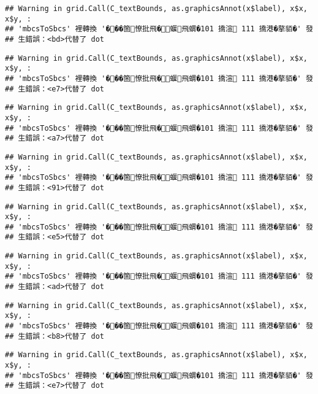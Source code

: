 \documentclass[
]{article}
\begin{document}
\begin{verbatim}
## Warning in grid.Call(C_textBounds, as.graphicsAnnot(x$label), x$x, x$y, :
## 'mbcsToSbcs' 裡轉換 '���箇憭批飛�蝘飛蝟�101 撟渲 111 撟港�摮貊�' 發
## 生錯誤：<bd>代替了 dot
\end{verbatim}

\begin{verbatim}
## Warning in grid.Call(C_textBounds, as.graphicsAnnot(x$label), x$x, x$y, :
## 'mbcsToSbcs' 裡轉換 '���箇憭批飛�蝘飛蝟�101 撟渲 111 撟港�摮貊�' 發
## 生錯誤：<e7>代替了 dot
\end{verbatim}

\begin{verbatim}
## Warning in grid.Call(C_textBounds, as.graphicsAnnot(x$label), x$x, x$y, :
## 'mbcsToSbcs' 裡轉換 '���箇憭批飛�蝘飛蝟�101 撟渲 111 撟港�摮貊�' 發
## 生錯誤：<a7>代替了 dot
\end{verbatim}

\begin{verbatim}
## Warning in grid.Call(C_textBounds, as.graphicsAnnot(x$label), x$x, x$y, :
## 'mbcsToSbcs' 裡轉換 '���箇憭批飛�蝘飛蝟�101 撟渲 111 撟港�摮貊�' 發
## 生錯誤：<91>代替了 dot
\end{verbatim}

\begin{verbatim}
## Warning in grid.Call(C_textBounds, as.graphicsAnnot(x$label), x$x, x$y, :
## 'mbcsToSbcs' 裡轉換 '���箇憭批飛�蝘飛蝟�101 撟渲 111 撟港�摮貊�' 發
## 生錯誤：<e5>代替了 dot
\end{verbatim}

\begin{verbatim}
## Warning in grid.Call(C_textBounds, as.graphicsAnnot(x$label), x$x, x$y, :
## 'mbcsToSbcs' 裡轉換 '���箇憭批飛�蝘飛蝟�101 撟渲 111 撟港�摮貊�' 發
## 生錯誤：<ad>代替了 dot
\end{verbatim}

\begin{verbatim}
## Warning in grid.Call(C_textBounds, as.graphicsAnnot(x$label), x$x, x$y, :
## 'mbcsToSbcs' 裡轉換 '���箇憭批飛�蝘飛蝟�101 撟渲 111 撟港�摮貊�' 發
## 生錯誤：<b8>代替了 dot
\end{verbatim}

\begin{verbatim}
## Warning in grid.Call(C_textBounds, as.graphicsAnnot(x$label), x$x, x$y, :
## 'mbcsToSbcs' 裡轉換 '���箇憭批飛�蝘飛蝟�101 撟渲 111 撟港�摮貊�' 發
## 生錯誤：<e7>代替了 dot
\end{verbatim}
\end{document}

